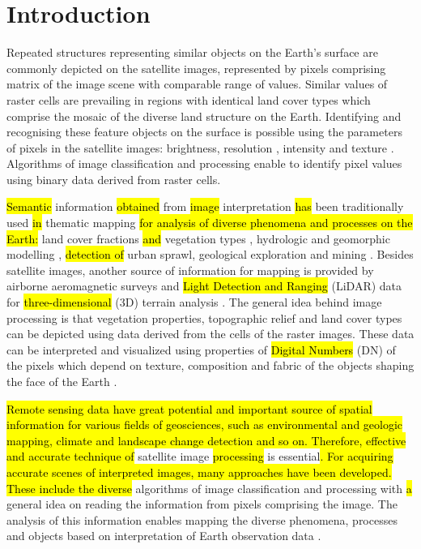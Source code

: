 \documentclass[jimaging,article,submit,pdftex,moreauthors]{Definitions/mdpi}
\begin{document}
\section{Introduction}
Repeated structures representing similar objects on the Earth's surface are commonly depicted on the satellite images, represented by pixels comprising\hl{ }matrix of the image scene with comparable range of values. Similar values of raster cells are prevailing in\hl{ }regions with identical land cover types which comprise the mosaic of the diverse land structure on the Earth. Identifying and recognising these feature objects on the surface is possible using the parameters of pixels in the satellite images: brightness, resolution \cite{4426419,322052,5446016}, intensity \cite{4761020,8519176} and texture \cite{995559,899813,8868688}. Algorithms of image classification and processing enable to identify pixel values using binary data derived from raster cells. 

\hl{Semantic} information \hl{obtained} from \hl{image }interpretation \hl{has} been traditionally used \hl{in} thematic mapping \hl{for analysis of diverse phenomena and processes on the Earth:} land cover fractions \cite{COULIBALY2021108092} \hl{and} vegetation types \cite{7729337,Lemenkova2020d,6946534,Lemenkova202019,6352694}, hydrologic and geomorphic modelling \cite{2015hydrologie}, \hl{detection of} urban sprawl, geological exploration and mining \cite{1457509,NGOM2022102873}. Besides\hl{ }satellite images, another source of information for mapping is provided by airborne aeromagnetic surveys \cite{JESSELL2015440,SIAGNE2022104680} and \hl{Light Detection and Ranging} (LiDAR) data for \hl{three-dimensional} (3D) terrain analysis \cite{SHARMA2021317,8978301,9213897,YEH2017236,9553919,LI201955,GUPTA2022100817}. The general idea behind\hl{ }image processing is that vegetation properties, topographic relief and land cover types can be depicted using data derived from the cells of the raster images. These data can be interpreted and visualized using \hl{ }properties of \hl{Digital Numbers} (DN) of the pixels which depend on\hl{ }texture, composition and fabric of the objects shaping the face of the Earth \cite{YUAN2022106966}.  

\hl{Remote sensing data have great potential and important source of spatial information for various fields of geosciences, such as environmental and geologic mapping, climate and landscape change detection and so on. Therefore, effective and accurate technique of} satellite image\hl{ processing} is essential\hl{. For acquiring accurate scenes of interpreted images, many approaches have been developed. These include the diverse} algorithms of image classification and processing\hl{ }with \hl{a }general idea\hl{ }on reading the information from\hl{ }pixels comprising the image. The analysis of this information enables mapping the diverse phenomena, processes and objects based on\hl{ }interpretation of\hl{ }Earth observation data \cite{PERIN2021106694,PAHLEVAN2022112860,Lemenkova202141,ABU2021107863,ATTOUMANE2022103285}. 
\end{document}
